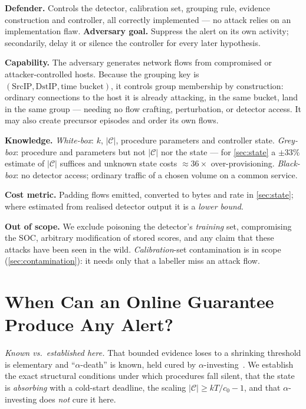 \documentclass[conference]{IEEEtran}
\newcommand{\Cal}{\mathcal{C}}
\newcommand{\nCal}{\lvert\Cal\rvert}
\begin{document}
\textbf{Defender.} Controls the detector, calibration set, grouping rule, evidence construction and
controller, all correctly implemented --- no attack relies on an implementation flaw.
\textbf{Adversary goal.} Suppress the alert on its own activity; secondarily, delay it or silence the
controller for every later hypothesis.

\textbf{Capability.} The adversary generates network flows from compromised or attacker-controlled
hosts. Because the grouping key is $(\mathrm{SrcIP}, \mathrm{DstIP}, \text{time bucket})$, it controls
group membership by construction: ordinary connections to the host it is already attacking, in the same
bucket, land in the same group --- needing no flow crafting, perturbation, or detector access. It may
also create precursor episodes and order its own flows.

\textbf{Knowledge.} \emph{White-box}: $k$, $\nCal$, procedure parameters and controller state.
\emph{Grey-box}: procedure and parameters but not $\nCal$ nor the state --- for \cref{sec:state} a
$\pm33\%$ estimate of $\nCal$ suffices and unknown state costs $\approx\!36\times$ over-provisioning.
\emph{Black-box}: no detector access; ordinary traffic of a chosen volume on a common service.

\textbf{Cost metric.} Padding flows emitted, converted to bytes and rate in
\cref{sec:state}; where estimated from realised detector output it is a \emph{lower bound}.

\textbf{Out of scope.} We exclude poisoning the detector's \emph{training} set, compromising the SOC,
arbitrary modification of stored scores, and any claim that these attacks have been seen in the
wild. \emph{Calibration}-set contamination is in scope (\cref{sec:contamination}): it needs only
that a labeller miss an attack flow.

\section{When Can an Online Guarantee Produce Any Alert?}\label{sec:feasibility}

\emph{Known vs.\ established here.} That bounded evidence loses to a shrinking threshold is elementary
and ``$\alpha$-death'' is known, held cured by $\alpha$-investing~\cite{foster2008alpha}. We establish
the exact structural conditions under which procedures fall silent, that the state is \emph{absorbing}
with a cold-start deadline, the scaling $\nCal \ge kT/c_0 - 1$, and that $\alpha$-investing does
\emph{not} cure it here.
\end{document}

